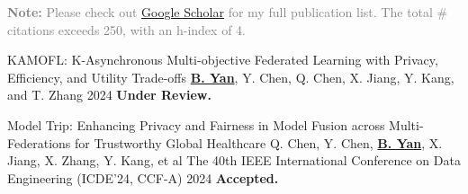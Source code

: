 
\begin{cvparagraph}
\textcolor{gray}{\textbf{Note:} Please check out \href{https://scholar.google.com/citations?hl=en&user=DVsgN1sAAAAJ}{Google Scholar} for my full publication list.
The total \# citations exceeds 250, with an h-index of 4.}
\end{cvparagraph}
\vspace{-1.0mm}
\begin{cvpublications}

\cvpublication
{KAMOFL: K-Asynchronous Multi-objective Federated Learning with Privacy, Efficiency, and Utility Trade-offs} %
{\underline{\textbf{B. Yan}}, Y. Chen, Q. Chen, X. Jiang, Y. Kang, and T. Zhang} %
{} %
{2024} %
{\textbf{Under Review.}} %






\cvpublication
{Model Trip: Enhancing Privacy and Fairness in Model Fusion across Multi-Federations for Trustworthy Global Healthcare} %
{Q. Chen, Y. Chen, \underline{\textbf{B. Yan}}, X. Jiang, X. Zhang, Y. Kang, et al} %
{The 40th IEEE International Conference on Data Engineering (ICDE'24, CCF-A)} %
{2024} %
{\textbf{Accepted.}} %



\end{cvpublications}
